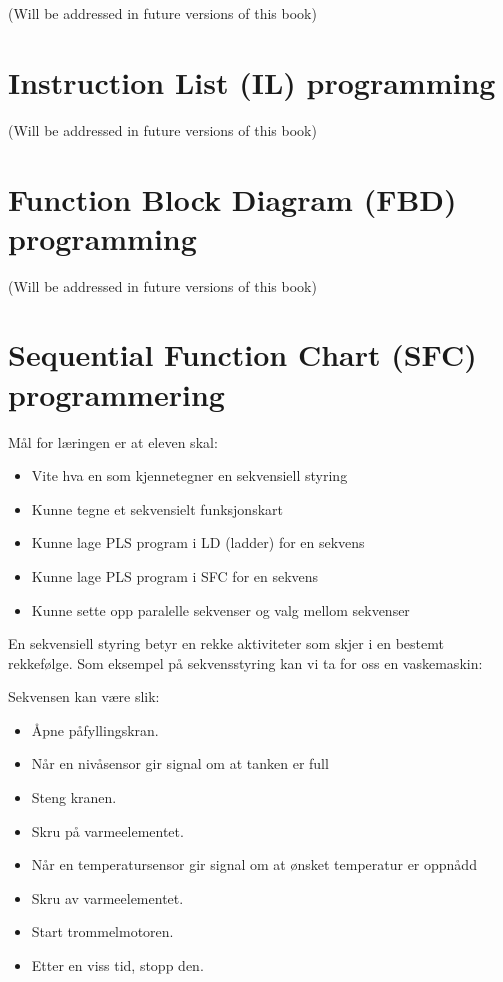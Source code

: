 (Will be addressed in future versions of this book)


\vskip 10pt





\filbreak
\section{Instruction List (IL) programming}

(Will be addressed in future versions of this book)

\vskip 10pt






\filbreak
\section{Function Block Diagram (FBD) programming}

(Will be addressed in future versions of this book)

\vskip 10pt






\filbreak
\section{Sequential Function Chart (SFC) programmering}
\vskip 10pt

Mål for læringen er at eleven skal: 
\vskip 10pt
\begin{itemize}
	\item Vite hva en som kjennetegner en sekvensiell styring 
	\item Kunne tegne et sekvensielt funksjonskart 
	\item Kunne lage PLS program i LD (ladder) for en sekvens
	\item Kunne lage PLS program i SFC for en sekvens 
	\item Kunne sette opp paralelle sekvenser og valg mellom sekvenser
\end{itemize}
\vskip 10pt
En sekvensiell styring betyr en rekke aktiviteter som skjer i en bestemt rekkefølge.
\vskip 10pt
Som eksempel på sekvensstyring kan vi ta for oss en vaskemaskin: 

Sekvensen kan være slik: 

 \begin{itemize}
		\item Åpne påfyllingskran.
		\item Når en nivåsensor gir signal om at tanken er full
		\item Steng kranen.
		\item Skru på varmeelementet.
		\item Når en temperatursensor gir signal om at ønsket temperatur er oppnådd
		\item Skru av varmeelementet.
		\item Start trommelmotoren.
		\item Etter en viss tid, stopp den.
 \end{itemize} 

